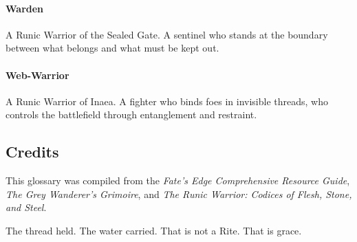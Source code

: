 \paragraph{Warden}
A Runic Warrior of the Sealed Gate. A sentinel who stands at the boundary between what belongs and what must be kept out.

\paragraph{Web-Warrior}
A Runic Warrior of Inaea. A fighter who binds foes in invisible threads, who controls the battlefield through entanglement and restraint.

\subsection*{Credits}

This glossary was compiled from the \textit{Fate's Edge Comprehensive Resource Guide}, \textit{The Grey Wanderer's Grimoire}, and \textit{The Runic Warrior: Codices of Flesh, Stone, and Steel}.

The thread held. The water carried. That is not a Rite. That is grace.
